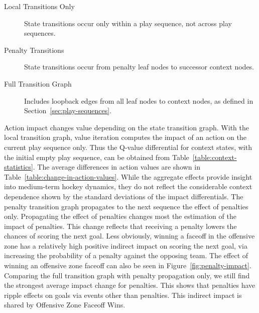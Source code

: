 \documentclass[]{article}
\begin{document}
\begin{description}
\item[Local Transitions Only]  State transitions occur only within a play sequence, not across play sequences.
\item[Penalty Transitions] State transitions occur from penalty leaf nodes to successor context nodes.
\item[Full Transition Graph] Includes loopback edges from all leaf nodes to context nodes, as defined in Section~\ref{sec:play-sequences}.
\end{description}

\begin{table}[htb]
\caption{Size of State Transition Graphs}
\label{table:size-of-graphs}
\begin{center}
\end{center}
\end{table}


Action impact changes value depending on the state transition graph. With the local transition graph, value iteration computes the impact of an action on the current play sequence only. Thus the Q-value differential for context states, with the initial empty play sequence, can be obtained from Table~\ref{table:context-statistics}. The average differences in action values
are shown in Table~\ref{table:change-in-action-values}. While the aggregate effects provide insight into medium-term hockey dynamics, they do not reflect the considerable context dependence shown by the standard deviations of the impact differentials. The penalty transition graph propagates to the next sequence the effect of penalties only. Propagating the effect of penalties changes most the estimation of the impact of penalties. This change reflects that receiving a penalty lowers the chances of scoring the next goal. Less obviously, winning a faceoff in the offensive zone has a relatively high positive indirect impact on scoring the next goal, via increasing the probability of a penalty against the opposing team. The effect of winning an offensive zone faceoff can also be seen in Figure~\ref{fig:penalty-impact}. Comparing the full transition graph with penalty propagation only, we still find the strongest average impact change for penalties. This shows that penalties have ripple effects on goals via events other than penalties. This indirect impact is shared by Offensive Zone Faceoff Wins. %
\end{document}
